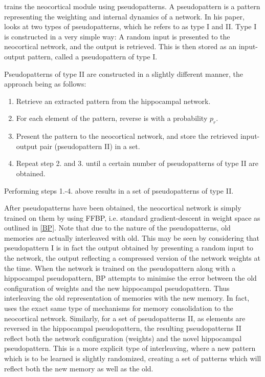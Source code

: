 \cite{Hattori2010} trains the neocortical module using pseudopatterns. A pseudopattern is a pattern representing the weighting and internal dynamics of a network. In his paper, \cite{Hattori2010} looks at two types of pseudopatterns, which he refers to as type I and II. Type I is constructed in a very simple way: A random input is presented to the neocortical network, and the output is retrieved. This is then stored as an input-output pattern, called a pseudopattern of type I.

Pseudopatterns of type II are constructed in a slightly different manner, the approach being as follows:

\begin{enumerate}
\item Retrieve an extracted pattern from the hippocampal network.
\item For each element of the pattern, reverse is with a probability $p_r$.
\item Present the pattern to the neocortical network, and store the retrieved input-output pair (pseudopattern II) in a set.
\item Repeat step 2. and 3. until a certain number of pseudopatterns of type II are obtained.
\end{enumerate}
Performing steps 1.-4. above results in a set of pseudopatterns of type II.

After pseudopatterns have been obtained, the neocortical network is simply trained on them by using FFBP, i.e. standard gradient-descent in weight space as outlined in \ref{BP}. Note that due to the nature of the pseudopatterns, old memories are actually interleaved with old. This may be seen by considering that pseudopattern I is in fact the output obtained by presenting a random input to the network, the output reflecting a compressed version of the network weights at the time. When the network is trained on the pseudopattern along with a hippocampal pseudopattern, BP attempts to minimise the error between the old configuration of weights and the new hippocampal pseudopattern. Thus interleaving the old representation of memories with the new memory. In fact, \cite{Hattori2014} uses the exact same type of mechanisms for memory consolidation to the neocortical network.
Similarly, for a set of pseudopatterns II, as elements are reversed in the hippocampal pseudopattern, the resulting pseudopatterns II reflect both the network configuration (weights) and the novel hippocampal pseudopattern. This is a more explicit type of interleaving, where a new pattern which is to be learned is slightly randomized, creating a set of patterns which will reflect both the new memory as well as the old.

